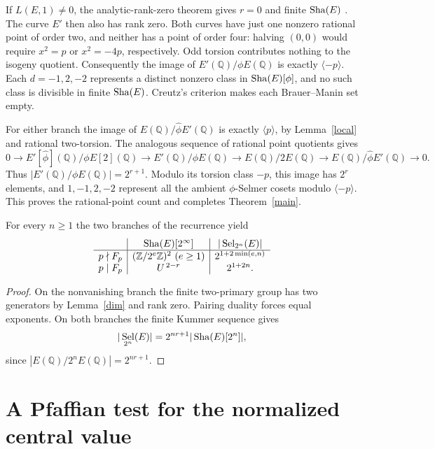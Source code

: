 \documentclass[11pt]{article}
\newcommand{\Q}{\mathbb Q}\newcommand{\Z}{\mathbb Z}\newcommand{\F}{\mathbb F}
\DeclareMathOperator{\Sel}{Sel}\DeclareMathOperator{\Br}{Br}
\begin{document}
If $L(E,1)\ne0$, the analytic-rank-zero theorem gives $r=0$ and finite $\mathop{\mathrm{Sha}}\nolimits(E)$ \cite[\S1]{bt}. The curve $E'$ then also has rank zero. Both curves have just one nonzero rational point of order two, and neither has a point of order four: halving $(0,0)$ would require $x^2=p$ or $x^2=-4p$, respectively. Odd torsion contributes nothing to the isogeny quotient. Consequently the image of $E'(\Q)/\phi E(\Q)$ is exactly $\langle-p\rangle$. Each $d=-1,2,-2$ represents a distinct nonzero class in $\mathop{\mathrm{Sha}}\nolimits(E)[\phi]$, and no such class is divisible in finite $\mathop{\mathrm{Sha}}\nolimits(E)$. Creutz's criterion makes each Brauer--Manin set empty.

For either branch the image of $E(\Q)/\widehat\phi E'(\Q)$ is exactly $\langle p\rangle$, by Lemma~\ref{local} and rational two-torsion. The analogous sequence of rational point quotients gives
\[
 0\longrightarrow E'[\widehat\phi](\Q)/\phi E[2](\Q)
 \longrightarrow E'(\Q)/\phi E(\Q)\longrightarrow E(\Q)/2E(\Q)
 \longrightarrow E(\Q)/\widehat\phi E'(\Q)\longrightarrow0 .
\]
Thus $|E'(\Q)/\phi E(\Q)|=2^{r+1}$. Modulo its torsion class $-p$, this image has $2^r$ elements, and $1,-1,2,-2$ represent all the ambient $\phi$-Selmer cosets modulo $\langle-p\rangle$. This proves the rational-point count and completes Theorem~\ref{main}.

\begin{corollary}
For every $n\ge1$ the two branches of the recurrence yield
\[
\begin{array}{c|c|c}
 & \Sha(E)[2^\infty] & |\Sel_{2^n}(E)|\\ \hline
 p\nmid F_p & (\Z/2^e\Z)^2\ (e\ge1) & 2^{1+2\min(e,n)}\\
 p\mid F_p & U^{\,2-r} &2^{1+2n}.
\end{array}
\]
\end{corollary}
\begin{proof}
On the nonvanishing branch the finite two-primary group has two generators by Lemma~\ref{dim} and rank zero. Pairing duality forces equal exponents. On both branches the finite Kummer sequence gives
\[
 |\Sel_{2^n}(E)|=2^{nr+1}|\Sha(E)[2^n]| ,
\]
since $|E(\Q)/2^nE(\Q)|=2^{nr+1}$.
\end{proof}

\section{A Pfaffian test for the normalized central value}
\end{document}
